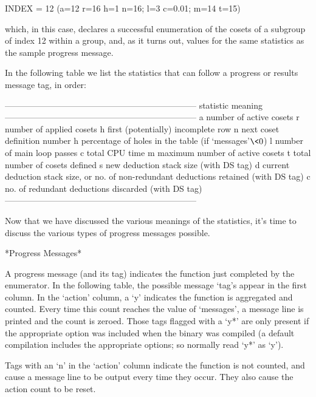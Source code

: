 \begintt
INDEX = 12 (a=12 r=16 h=1 n=16; l=3 c=0.01; m=14 t=15)
\endtt

which, in this case, declares a successful enumeration of  the  cosets
of a subgroup of index 12 within a group, and, as it turns out, values
for the same statistics as the sample progress message.

In the following table we  list  the  statistics  that  can  follow  a
progress or results message tag, in order:

\begintt
--------------------------------------------------------------------
statistic   meaning
--------------------------------------------------------------------
a           number of active cosets
r           number of applied cosets
h           first (potentially) incomplete row
n           next coset definition number
h           percentage of holes in the table (if `messages'$ \< 0$) 
l           number of main loop passes
c           total CPU time
m           maximum number of active cosets
t           total number of cosets defined
s           new deduction stack size (with DS tag)
d           current deduction stack size, or
              no. of non-redundant deductions retained (with DS tag)
c           no. of redundant deductions discarded (with DS tag)
--------------------------------------------------------------------
\endtt

Now that we have discussed the various  meanings  of  the  statistics,
it's time to discuss the various types of progress messages possible.

*Progress Messages*

A progress message (and its tag) indicates the function just completed
by the enumerator. In the following table, the possible message `tag's
appear in the first column. In the `action' column,  a  `y'  indicates
the function is aggregated and counted. Every time this count  reaches
the value of `messages', a message line is printed and  the  count  is
zeroed. Those tags flagged  with  a  `y*'  are  only  present  if  the
appropriate option was included when the {\ACE} binary was compiled (a
default compilation includes the appropriate options; so normally read
`y*' as `y').

Tags with an `n' in the `action' column indicate the function  is  not
counted, and cause a message line to be output every time they  occur.
They also cause the action count to be reset.

